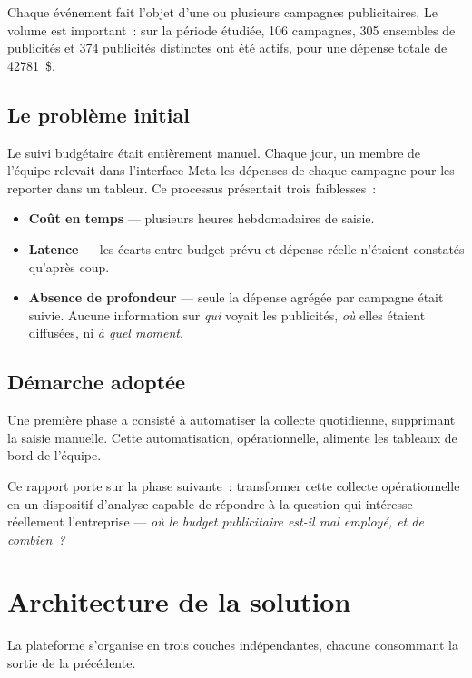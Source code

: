 \documentclass[11pt,a4paper]{article}
\begin{document}
Chaque événement fait l'objet d'une ou plusieurs campagnes publicitaires. Le
volume est important~: sur la période étudiée, \num{106} campagnes, \num{305}
ensembles de publicités et \num{374} publicités distinctes ont été actifs, pour
une dépense totale de \num{42781}~\$.

\subsection{Le problème initial}

Le suivi budgétaire était entièrement manuel. Chaque jour, un membre de
l'équipe relevait dans l'interface Meta les dépenses de chaque campagne pour les
reporter dans un tableur. Ce processus présentait trois faiblesses~:

\begin{itemize}
  \item \textbf{Coût en temps} --- plusieurs heures hebdomadaires de saisie.
  \item \textbf{Latence} --- les écarts entre budget prévu et dépense réelle
        n'étaient constatés qu'après coup.
  \item \textbf{Absence de profondeur} --- seule la dépense agrégée par
        campagne était suivie. Aucune information sur \emph{qui} voyait les
        publicités, \emph{où} elles étaient diffusées, ni \emph{à quel moment}.
\end{itemize}

\subsection{Démarche adoptée}

Une première phase a consisté à automatiser la collecte quotidienne, supprimant
la saisie manuelle. Cette automatisation, opérationnelle, alimente les tableaux
de bord de l'équipe.

Ce rapport porte sur la phase suivante~: transformer cette collecte
opérationnelle en un dispositif d'analyse capable de répondre à la question qui
intéresse réellement l'entreprise --- \emph{où le budget publicitaire est-il mal
employé, et de combien~?}

\section{Architecture de la solution}

La plateforme s'organise en trois couches indépendantes, chacune consommant la
sortie de la précédente.
\end{document}
